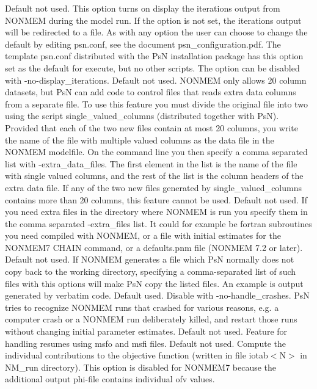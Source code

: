 \begin{optionlist}
\nextopt
{}
Default not used.  This option turns on display the iterations output from NONMEM during the model run. If the option is not set, the iterations output will be redirected to a file. As with any option the user can choose to change the default by editing psn.conf, see the document psn\_configuration.pdf. The template psn.conf distributed with the PsN installation package has this option set as the default for execute, but no other scripts. The option can be disabled with -no-display\_iterations. 
\nextopt
{}
Default not used. NONMEM only allows 20 column datasets, but PsN can add code to control files that reads extra data columns from a separate file. To use this feature you must divide the original file into two using the script single\_valued\_columns (distributed together with PsN). Provided that each of the two new files contain at most 20 columns, you write the name of the file with multiple valued columns as the data file in the NONMEM modelfile. On the command line you then specify a comma separated list with -extra\_data\_files. The first element in the list is the name of the file with single valued columns, and the rest of the list is the column headers of the extra data file. If any of the two new files generated by single\_valued\_columns contains more than 20 columns, this feature cannot be used. 
\nextopt
{}
Default not used. If you need extra files in the directory where NONMEM is run you specify them in the comma separated -extra\_files list. It could for example be fortran subroutines you need compiled with NONMEM, or a file with initial estimates for the NONMEM7 CHAIN command, or a defaults.pnm file (NONMEM 7.2 or later). 
\nextopt
{}
Default not used. If NONMEM generates a file which PsN normally does not copy back to the working directory, specifying a comma-separated list of such files with this options will make PsN copy the listed files. An example is output generated by verbatim code. 
\nextopt
{}
Default used. Disable with -no-handle\_crashes. PsN tries to recognize NONMEM runs that crashed for various reasons, e.g. a computer crash or a NONMEM run deliberately killed, and restart those runs without changing initial parameter estimates. 
\nextopt
{}
Default not used. Feature for handling resumes using msfo and msfi files. 
\nextopt
{}
Default not used. Compute the individual contributions to the objective function (written in file iotab$<$N$>$ in NM\_run directory). This option is disabled for NONMEM7 because the additional output phi-file contains individual ofv values. 

\end{optionlist}
